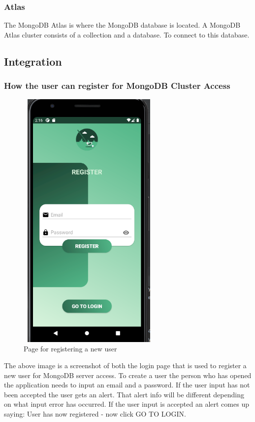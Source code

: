\subsubsection{Atlas}
The MongoDB Atlas is where the MongoDB database is located. A MongoDB Atlas cluster consists of a collection and a database. To connect to this database.
\subsection{Integration}
\subsubsection{How the user can register for MongoDB Cluster Access}
\begin{figure}[H]
    \centering
    \includegraphics[width=7cm, height = 13cm]{img/registerPage.PNG}
    \caption{Page for registering a new user}
    \label{fig:altas config}
\end{figure}
The above image is a screenshot of both the login page that is used to register a new user for MongoDB server access. To create a user the person who has opened the application needs to input an email and a password. If the user input has not been accepted the user gets an alert. That alert info will be different depending on what input error has occurred. If the user input is accepted an alert comes up saying: User has now registered - now click GO TO LOGIN.
